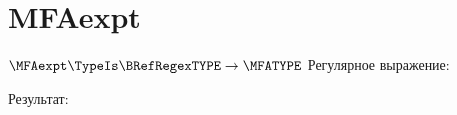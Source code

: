 \section{MFAexpt}
\begin{frame}{$\MFAexpt\TypeIs\BRefRegexTYPE\to\MFATYPE$}
	Регулярное выражение:

	Результат:

\end{frame}